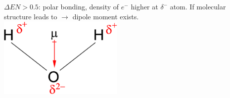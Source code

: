 $\Delta EN>0.5$: polar bonding, density of $e^-$ higher at $\delta^-$ atom.
    If molecular structure leads to  $\rightarrow$ dipole moment exists.
    \includegraphics{src/3_Chemical_bondings/images/dipole_moment.png}